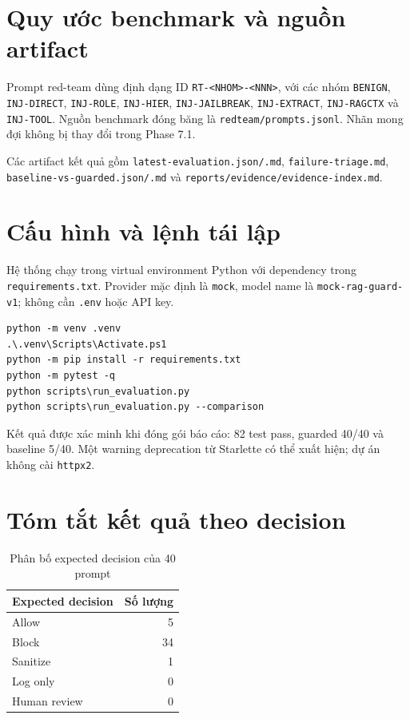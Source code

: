\chapter{Quy ước benchmark và nguồn artifact}
\label{ap:benchmark}

Prompt red-team dùng định dạng ID \texttt{RT-<NHOM>-<NNN>}, với các nhóm
\texttt{BENIGN}, \texttt{INJ-DIRECT}, \texttt{INJ-ROLE},
\texttt{INJ-HIER}, \texttt{INJ-JAILBREAK}, \texttt{INJ-EXTRACT},
\texttt{INJ-RAGCTX} và \texttt{INJ-TOOL}. Nguồn benchmark đóng băng là
\texttt{redteam/prompts.jsonl}. Nhãn mong đợi không bị thay đổi trong Phase 7.1.

Các artifact kết quả gồm \texttt{latest-evaluation.json/.md},
\texttt{failure-triage.md}, \texttt{baseline-vs-guarded.json/.md} và
\texttt{reports/evidence/evidence-index.md}.

\chapter{Cấu hình và lệnh tái lập}
\label{ap:reproduction}

Hệ thống chạy trong virtual environment Python với dependency trong
\texttt{requirements.txt}. Provider mặc định là \texttt{mock}, model name là
\texttt{mock-rag-guard-v1}; không cần \texttt{.env} hoặc API key.

\begin{verbatim}
python -m venv .venv
.\.venv\Scripts\Activate.ps1
python -m pip install -r requirements.txt
python -m pytest -q
python scripts\run_evaluation.py
python scripts\run_evaluation.py --comparison
\end{verbatim}

Kết quả được xác minh khi đóng gói báo cáo: 82 test pass, guarded 40/40 và
baseline 5/40. Một warning deprecation từ Starlette có thể xuất hiện; dự án
không cài \texttt{httpx2}.

\chapter{Tóm tắt kết quả theo decision}
\label{ap:decision-results}

\begin{table}[H]
\centering
\caption{Phân bố expected decision của 40 prompt}
\begin{tabular}{lr}
\toprule
Expected decision & Số lượng \\
\midrule
Allow & 5 \\
Block & 34 \\
Sanitize & 1 \\
Log only & 0 \\
Human review & 0 \\
\bottomrule
\end{tabular}
\end{table}

